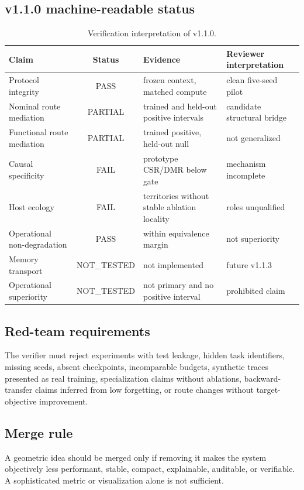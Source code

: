 \documentclass[11pt,a4paper]{article}
\begin{document}
\subsection{v1.1.0 machine-readable status}
\begin{table}[H]\centering\small
\caption{Verification interpretation of v1.1.0.}
\begin{tabularx}{\textwidth}{lclY}
\toprule
Claim & Status & Evidence & Reviewer interpretation\\
\midrule
Protocol integrity & PASS & frozen context, matched compute & clean five-seed pilot\\
Nominal route mediation & PARTIAL & trained and held-out positive intervals & candidate structural bridge\\
Functional route mediation & PARTIAL & trained positive, held-out null & not generalized\\
Causal specificity & FAIL & prototype CSR/DMR below gate & mechanism incomplete\\
Host ecology & FAIL & territories without stable ablation locality & roles unqualified\\
Operational non-degradation & PASS & within equivalence margin & not superiority\\
Memory transport & NOT\_TESTED & not implemented & future v1.1.3\\
Operational superiority & NOT\_TESTED & not primary and no positive interval & prohibited claim\\
\bottomrule
\end{tabularx}
\end{table}

\subsection{Red-team requirements}
The verifier must reject experiments with test leakage, hidden task identifiers, missing seeds, absent checkpoints, incomparable budgets, synthetic traces presented as real training, specialization claims without ablations, backward-transfer claims inferred from low forgetting, or route changes without target-objective improvement.

\subsection{Merge rule}
A geometric idea should be merged only if removing it makes the system objectively less performant, stable, compact, explainable, auditable, or verifiable. A sophisticated metric or visualization alone is not sufficient.
\end{document}
